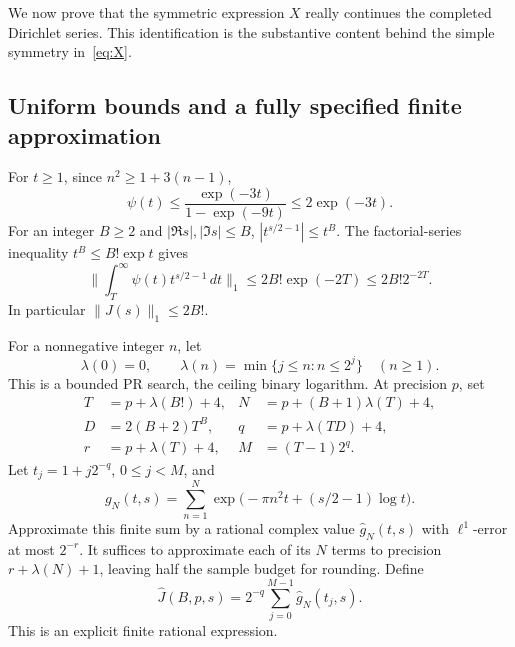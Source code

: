 \documentclass[11pt,letterpaper]{article}
\numberwithin{equation}{section}
\theoremstyle{definition}
\newcommand{\normone}[1]{\lVert #1\rVert_1}
\newcommand{\ps}{\psi}
\newcommand{\Jh}{\widehat J}
\newcommand{\lceilog}{\lambda}
\begin{document}
We now prove that the symmetric expression \(X\) really continues the
completed Dirichlet series. This identification is the substantive
content behind the simple symmetry in~\eqref{eq:X}.

\subsection{Uniform bounds and a fully specified finite approximation}

For \(t\ge1\), since \(n^2\ge1+3(n-1)\),
\begin{equation}
 \ps(t)\le\frac{\exp(-3t)}{1-\exp(-9t)}
                    \le2\exp(-3t).                      \label{eq:psitail}
\end{equation}
For an integer \(B\ge2\) and \(|\Re s|,|\Im s|\le B\),
\(|t^{s/2-1}|\le t^B\). The factorial-series inequality
\(t^B\le B!\exp t\) gives
\begin{equation}
 \normone{\int_T^\infty\ps(t)t^{s/2-1}\,dt}
             \le2B!\exp(-2T)\le2B!2^{-2T}.                \label{eq:Jtail}
\end{equation}
In particular \(\normone{J(s)}\le2B!\).

For a nonnegative integer \(n\), let
\[
 \lceilog(0)=0,\qquad
 \lceilog(n)=\min\{j\le n:n\le2^j\}\quad(n\ge1).
\]
This is a bounded PR search, the ceiling binary logarithm.
At precision \(p\), set
\begin{align}
 T&=p+\lceilog(B!)+4,&
 N&=p+(B+1)\lceilog(T)+4,\nonumber\\
 D&=2(B+2)T^B,&
 q&=p+\lceilog(TD)+4,\nonumber\\
 r&=p+\lceilog(T)+4,&
 M&=(T-1)2^q.                                            \label{eq:Jcutoffs}
\end{align}
Let \(t_j=1+j2^{-q}\), \(0\le j<M\), and
\begin{equation}
 g_N(t,s)=\sum_{n=1}^N
        \exp\bigl(-\pi n^2t+(s/2-1)\log t\bigr).
 \label{eq:gn}
\end{equation}
Approximate this finite sum by a rational complex value
\(\widehat g_N(t,s)\) with \(\ell^1\)-error at most \(2^{-r}\).
It suffices to approximate each of its \(N\) terms to precision
\(r+\lceilog(N)+1\), leaving half the sample budget for rounding.
Define
\begin{equation}
            \Jh(B,p,s)=2^{-q}\sum_{j=0}^{M-1}
                                    \widehat g_N(t_j,s).  \label{eq:Jhat}
\end{equation}
This is an explicit finite rational expression.
\end{document}
